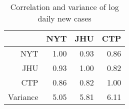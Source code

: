 \begin{table}[ht]
\centering
\begin{tabular}{rrrr}
  \hline
 & NYT & JHU & CTP \\ 
  \hline
NYT & 1.00 & 0.93 & 0.86 \\ 
  JHU & 0.93 & 1.00 & 0.82 \\ 
  CTP & 0.86 & 0.82 & 1.00 \\ 
  Variance & 5.05 & 5.81 & 6.11 \\ 
   \hline
\end{tabular}
\caption{Correlation and variance of log daily new cases\label{tab:newcasecor}} 
\end{table}
